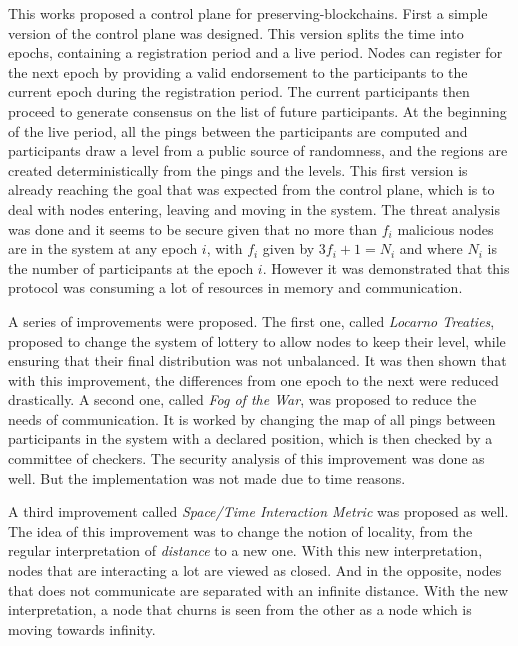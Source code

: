 \documentclass[a4paper,11pt,oneside]{report}
\begin{document}

This works proposed a control plane for preserving-blockchains. First a simple
version of the control plane was designed. This version splits the time into
epochs, containing a registration period and a live period. Nodes can register
for the next epoch by providing a valid endorsement to the participants to the
current epoch during the registration period. The current participants then
proceed to generate consensus on the list of future participants. At the
beginning of the live period, all the pings between the participants are
computed and participants draw a level from a public source of randomness, and
the regions are created deterministically from the pings and the levels. This
first version is already reaching the goal that was expected from the control
plane, which is to deal with nodes entering, leaving and moving in the system.
The threat analysis was done and it seems to be secure given that no more than
$f_i$ malicious nodes are in the system at any epoch $i$, with $f_i$ given by
$3f_i+1=N_i$ and where $N_i$ is the number of participants at the epoch $i$.
However it was demonstrated that this protocol was consuming a lot of resources
in memory and communication. 

A series of improvements were proposed. The first one, called \textit{Locarno
Treaties}, proposed to change the system of lottery to allow nodes to keep
their level, while ensuring that their final distribution was not unbalanced.
It was then shown that with this improvement, the differences from one epoch to
the next were reduced drastically. A second one, called \textit{Fog of the
War}, was proposed to reduce the needs of communication. It is worked by
changing the map of all pings between participants in the system with a
declared position, which is then checked by a committee of checkers. The
security analysis of this improvement was done as well. But the implementation
was not made due to time reasons. 

A third improvement called \textit{Space/Time Interaction Metric} was proposed
as well. The idea of this improvement was to change the notion of locality,
from the regular interpretation of \textit{distance} to a new one. With this
new interpretation, nodes that are interacting a lot are viewed as closed. And
in the opposite, nodes that does not communicate are separated with an infinite
distance. With the new interpretation, a node that churns is seen from the
other as a node which is moving towards infinity.  
\end{document}
